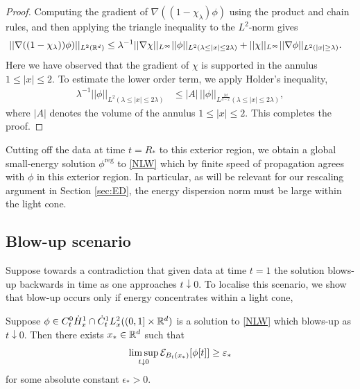 \begin{proof}
	Computing the gradient of $\nabla ((1-\chi_\lambda) \phi)$ using the product and chain rules, and then applying the triangle inequality to the $L^2$-norm gives 
		\begin{align*}
			||\nabla ((1- \chi_\lambda)) \phi) ||_{L^2 (\mathbb R^d)} 
				&\leq \lambda^{-1} ||\nabla \chi||_{L^\infty} || \phi||_{L^2 (\lambda \leq |x| \leq 2\lambda)} + ||\chi ||_{L^\infty} || \nabla \phi||_{L^2 (|x| \geq \lambda)} .
		\end{align*}
	Here we have observed that the gradient of $\chi$ is supported in the annulus $1 \leq |x| \leq 2$. To estimate the lower order term, we apply Holder's inequality,
		\begin{align*}
			 \lambda^{-1} || \phi||_{L^2 (\lambda \leq |x| \leq 2\lambda)}
			 	&\leq  |A|\,  ||\phi||_{L^{\frac{2d}{d - 2}} (\lambda \leq |x| \leq 2\lambda)},
		\end{align*}	
	where $|A|$ denotes the volume of the annulus $1 \leq |x| \leq 2$. This completes the proof. 
\end{proof}

Cutting off the data at time $t = R_*$ to this exterior region, we obtain a global small-energy solution $\phi^{\mathrm{reg}}$ to \eqref{NLW} which by finite speed of propagation agrees with $\phi$ in this exterior region. In particular, as will be relevant for our rescaling argument in Section \ref{sec:ED}, the energy dispersion norm must be large within the light cone. 


\subsection{Blow-up scenario}

Suppose towards a contradiction that given data at time $t = 1$ the solution blows-up backwards in time as one approaches $t \downarrow 0$. To localise this scenario, we show that blow-up occurs only if energy concentrates within a light cone, 


\begin{proposition}\label{prop:blowup}
	Suppose $\phi \in C^0_{t} \dot H^1_x \cap \dot C^1_{t} L^2_x ((0, 1] \times \mathbb R^d)$ is a solution to \eqref{NLW} which blows-up as $t\downarrow 0$. Then there exists $x_* \in \mathbb R^d$ such that 
		\[
			\limsup_{t \downarrow 0} \mathcal E_{B_{t} (x_*)} [\phi[t]] \geq \varepsilon_* 
		\]
	for some absolute constant $\epsilon_* > 0$. 	
\end{proposition}

